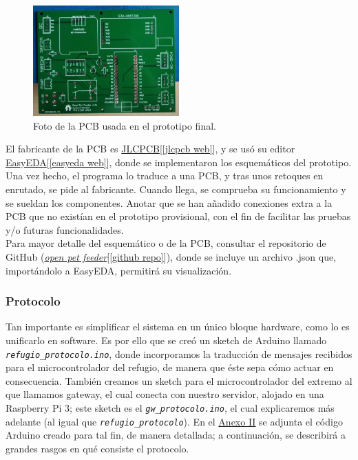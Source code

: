 \documentclass[12pt]{article}
\begin{document}
	\begin{figure}[h]
		\begin{center}
			\includegraphics[width=0.5\textwidth]{img/pcb_v1.1a.png}
			\caption{Foto de la PCB usada en el prototipo final.}
			\label{Foto PCB v1.1a}
		\end{center}
	\end{figure}
	
	\noindent El fabricante de la PCB es \href{https://jlcpcb.com/}{JLCPCB}[\ref{jlcpcb web}], y se usó su editor \href{https://easyeda.com/es}{EasyEDA}[\ref{easyeda web}], donde se implementaron los esquemáticos del prototipo. Una vez hecho, el programa lo traduce a una PCB, y tras unos retoques en enrutado, se pide al fabricante. Cuando llega, se comprueba su funcionamiento y se sueldan los componentes. Anotar que se han añadido conexiones extra a la PCB que no existían en el prototipo provisional, con el fin de facilitar las pruebas y/o futuras funcionalidades.\\
	
	\noindent Para mayor detalle del esquemático o de la PCB, consultar el repositorio de GitHub (\href{https://github.com/ChiaFranfer/open-pet-feeder}{\textit{open pet feeder}}[\ref{github repo}]), donde se incluye un archivo .json que, importándolo a EasyEDA, permitirá su visualización. \\
	
	\subsubsection{Protocolo}
	\label{protocolo explicacion}
	
	\noindent Tan importante es simplificar el sistema en un único bloque hardware, como lo es unificarlo en software. Es por ello que se creó un sketch de Arduino llamado \texttt{\textit{refugio\_protocolo.ino}}, donde incorporamos la traducción de mensajes recibidos para el microcontrolador del refugio, de manera que éste sepa cómo actuar en consecuencia. También creamos un sketch para el microcontrolador del extremo al que llamamos gateway, el cual conecta con nuestro servidor, alojado en una Raspberry Pi 3; este sketch es el \texttt{\textit{gw\_protocolo.ino}}, el cual explicaremos más adelante (al igual que \texttt{\textit{refugio\_protocolo}}).  En el \hyperref[anexo II: codigo]{Anexo II}  se adjunta el código Arduino creado para tal fin, de manera detallada; a continuación, se describirá a grandes rasgos en qué consiste el protocolo.\\
	
\end{document}
